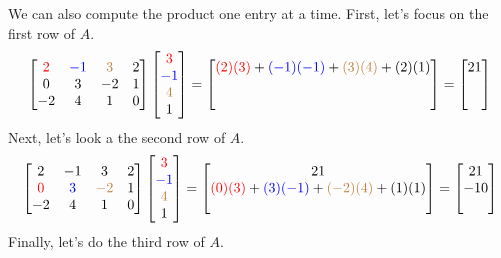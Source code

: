 \documentclass{ximera}
\begin{document}
\begin{example}
We can also compute the product one entry at a time.  First, let's focus on the first row of $A$.
$$\begin{bmatrix}{\color{red}2}&{\color{blue}-1}&{\color{brown}3}&2\\0&3&-2&1\\-2&4&1&0\end{bmatrix}\begin{bmatrix}{\color{red}3}\\{\color{blue}-1}\\{\color{brown}4}\\1\end{bmatrix}=\begin{bmatrix}{\color{red}(2)( 3)}+{\color{blue}(-1)(-1)}+{\color{brown}(3)(4)}+(2)(1)\\ \\ \\\end{bmatrix}=\begin{bmatrix}21\\ \\ \\\end{bmatrix}
$$
Next, let's look a the second row of $A$.
$$\begin{bmatrix}2&-1&3&2\\{\color{red}0}&{\color{blue}3}&{\color{brown}-2}&1\\-2&4&1&0\end{bmatrix}\begin{bmatrix}{\color{red}3}\\{\color{blue}-1}\\{\color{brown}4}\\1\end{bmatrix}=\begin{bmatrix}21\\{\color{red}(0)( 3)}+{\color{blue}(3)(-1)}+{\color{brown}(-2)(4)}+(1)(1)\\ \\ \end{bmatrix}=\begin{bmatrix}21\\-10 \\ \\\end{bmatrix}
$$
Finally, let's do the third row of $A$.

\end{example}
\end{document}
